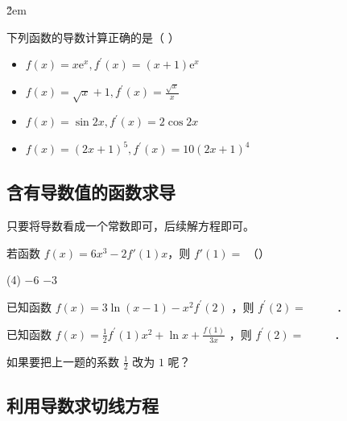 \v{2em}

\begin{example}
    下列函数的导数计算正确的是（ \quad）
    \begin{itemize}
        \item $f(x)=x \mathrm{e}^x, f^{\prime}(x)=(x+1) \mathrm{e}^x$
        \item $f(x)=\sqrt{x}+1, f^{\prime}(x)=\frac{\sqrt{x}}{x}$
        \item $f(x)=\sin 2 x, f^{\prime}(x)=2 \cos 2 x$
        \item $f(x)=(2 x+1)^5, f^{\prime}(x)=10(2 x+1)^4$
    \end{itemize}
\end{example}

\subsection{含有导数值的函数求导}

\begin{theorem}
    只要将导数看成一个常数即可，后续解方程即可。
\end{theorem}

\begin{example}
    若函数 $f(x) = 6x^{3} - 2f'(1)x$，则 $f'(1) =$ （\quad）
    \begin{tasks}(4)
          \task $- 6$ \task $- 3$
    \end{tasks}
\end{example}

\vspace{4em}

\begin{example}
    已知函数 $f(x)=3 \ln (x-1)-x^2 f^{\prime}(2)$ ，则 $f^{\prime}(2)=$ \underline{$\qquad$} ．
\end{example}

\vspace{4em}

\begin{example}
    已知函数 $f(x)=\frac{1}{2} f^{\prime}(1) x^2+\ln x+\frac{f(1)}{3 x}$ ，则 $f^{\prime}(2)=$ \underline{$\qquad$} ．
\end{example}

\begin{problem}
如果要把上一题的系数 $\frac{1}{2} $ 改为 $1$ 呢？
\end{problem}

\vspace{4em}

\subsection{利用导数求切线方程}

